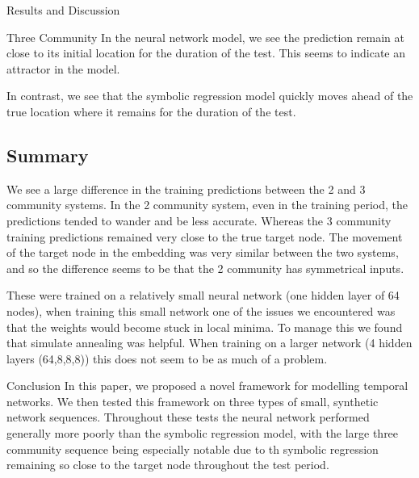 \documentclass[12pt]{amsart}
\begin{document}
\begin{section}{Results and Discussion}
\begin{subsection}{Three Community}
        In the neural network model, we see the prediction remain at close to its initial location for the duration of the test. This seems to indicate an attractor in the model.

        In contrast, we see that the symbolic regression model quickly moves ahead of the true location where it remains for the duration of the test.


        
        \subsection{Summary}
        We see a large difference in the training predictions between the 2 and 3 community systems. In the 2 community system, even in the training period, the predictions tended to wander and be less accurate. Whereas the 3 community training predictions remained very close to the true target node. The movement of the target node in the embedding was very similar between the two systems, and so the difference seems to be that the 2 community has symmetrical inputs.

        These were trained on a relatively small neural network (one hidden layer of 64 nodes), when training this small network one of the issues we encountered was that the weights would become stuck in local minima. To manage this we found that simulate annealing was helpful. When training on a larger network (4 hidden layers (64,8,8,8)) this does not seem to be as much of a problem.
    \end{subsection}

\end{section}

\begin{section}{Conclusion}
    In this paper, we proposed a novel framework for modelling temporal networks. We then tested this framework on three types of small, synthetic network sequences. Throughout these tests the neural network performed generally more poorly than the symbolic regression model, with the large three community sequence being especially notable due to th symbolic regression remaining so close to the target node throughout the test period. 
\end{section} 


\printbibliography
\end{document}
